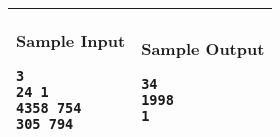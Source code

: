 \begin{table}[!h]
\centering
\begin{tabular}{|l|l|}
\hline
\begin{minipage}[t]{3in}
\textbf{Sample Input}
\begin{verbatim}
3
24 1
4358 754
305 794
\end{verbatim}
\vspace{1mm}
\end{minipage}
&

\begin{minipage}[t]{3in}
\textbf{Sample Output}
\begin{verbatim}
34
1998
1
\end{verbatim}
\vspace{1mm}
\end{minipage} \\
\hline
\end{tabular}
\end{table}

\newpage

